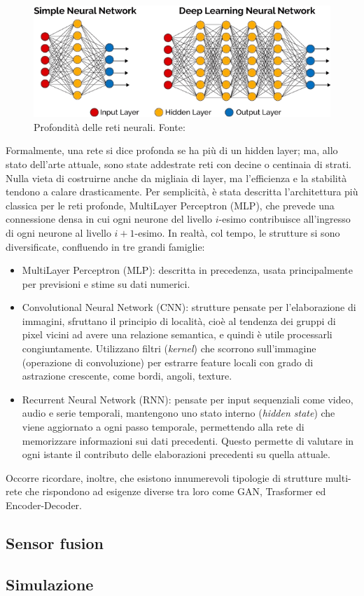 \begin{figure}[h]
    \centering
    \includegraphics[width=0.6\linewidth]{immagini/deep_neural_network.png}
    \caption{Profondità delle reti neurali. Fonte: \cite{rosi2025vea}}
    \label{fig:deep_neural}
\end{figure}

Formalmente, una rete si dice profonda se ha più di un hidden layer; ma, allo stato dell'arte attuale, sono state addestrate reti con decine o centinaia di strati. Nulla vieta di costruirne anche da migliaia di layer, ma l'efficienza e la stabilità tendono a calare drasticamente. Per semplicità, è stata descritta l'architettura più classica per le reti profonde, MultiLayer Perceptron (MLP), che prevede una connessione densa in cui ogni neurone del livello $i$-esimo contribuisce all'ingresso di ogni neurone al livello  $i+1$-esimo. In realtà, col tempo, le strutture si sono diversificate, confluendo in tre grandi famiglie:
\begin{itemize}
    \item MultiLayer Perceptron (MLP): descritta in precedenza, usata principalmente per previsioni e stime su dati numerici.
    \item Convolutional Neural Network (CNN): strutture pensate per l'elaborazione di immagini, sfruttano il principio di località, cioè al tendenza dei gruppi di pixel vicini ad avere una relazione semantica, e quindi è utile processarli congiuntamente. Utilizzano filtri (\textit{kernel}) che scorrono sull'immagine (operazione di convoluzione) per estrarre feature locali con grado di astrazione crescente, come bordi, angoli, texture.
    \item Recurrent Neural Network (RNN): pensate per input sequenziali come video, audio e serie temporali, mantengono uno stato interno (\textit{hidden state}) che viene aggiornato a ogni passo temporale, permettendo alla rete di memorizzare informazioni sui dati precedenti. Questo permette di valutare in ogni istante il contributo delle elaborazioni precedenti su quella attuale.
\end{itemize}

Occorre ricordare, inoltre, che esistono innumerevoli tipologie di strutture multi-rete che rispondono ad esigenze diverse tra loro come GAN, Trasformer ed Encoder-Decoder. 


\subsection{Sensor fusion}

\subsection{Simulazione}
